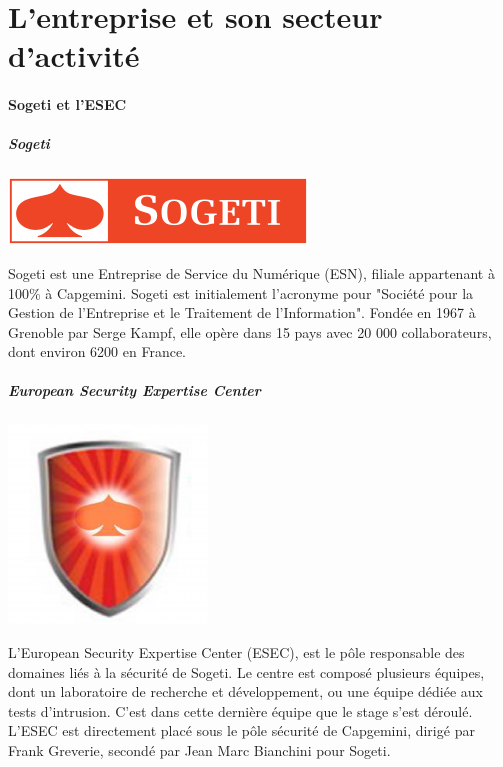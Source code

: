 \section*{L'entreprise et son secteur d'activité}
\paragraph{Sogeti et l'ESEC}
\subparagraph{Sogeti}
\begin{center}
\includegraphics[scale=0.7]{sogeti.png}
\end{center}
Sogeti est une Entreprise de Service du Numérique (ESN), filiale appartenant
à 100\% à Capgemini. Sogeti est initialement l'acronyme pour "Société pour la Gestion de
l'Entreprise et le Traitement de l'Information". Fondée en 1967 à Grenoble par Serge Kampf, elle opère
dans 15 pays avec 20 000 collaborateurs, dont environ 6200 en France.
\paragraph{}
\paragraph{}

\subparagraph{European Security Expertise Center}
\begin{center}
\includegraphics[scale=0.4]{esec.png}
\end{center}
L'European Security Expertise Center (ESEC), est le pôle responsable des domaines
liés à la sécurité de Sogeti. Le centre est composé plusieurs équipes, dont un
laboratoire de recherche et développement, ou une équipe dédiée aux tests d'intrusion.
C'est dans cette dernière équipe que le stage s'est déroulé.
L'ESEC est directement placé sous le pôle sécurité de Capgemini, dirigé par Frank
Greverie, secondé par Jean Marc Bianchini pour Sogeti.

